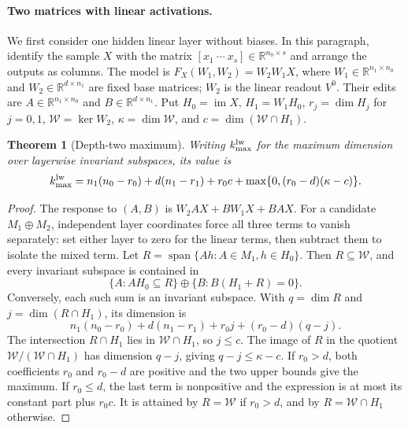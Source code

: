 \documentclass[twoside]{article}
\newtheorem{theorem}{Theorem}
\theoremstyle{remark}
\DeclareMathOperator{\spanop}{span}
\newcommand{\R}{\mathbb R}
\theoremstyle{highlightdefinition}
\theoremstyle{remark}
\newcommand{\spn}{\spanop}
\begin{document}
\paragraph{Two matrices with linear activations.}
We first consider one hidden linear layer without biases. In this paragraph, identify the sample $X$ with the matrix $[x_1\ \cdots\ x_s]\in\R^{n_0\times s}$ and arrange the outputs as columns. The model is $F_X(W_1,W_2)=W_2W_1X$, where $W_1\in\R^{n_1\times n_0}$ and $W_2\in\R^{d\times n_1}$ are fixed base matrices; $W_2$ is the linear readout $V^0$. Their edits are $A\in\R^{n_1\times n_0}$ and $B\in\R^{d\times n_1}$. Put $H_0=\operatorname{im}X$, $H_1=W_1H_0$, $r_j=\dim H_j$ for $j=0,1$, $\mathcal W=\ker W_2$, $\kappa=\dim\mathcal W$, and $c=\dim(\mathcal W\cap H_1)$.
\begin{theorem}[Depth-two maximum]\label{thm:depth-two}
Writing $k_{\max}^{\rm lw}$ for the maximum dimension over layerwise invariant subspaces, its value is
\[
 k_{\max}^{\rm lw}=n_1(n_0-r_0)+d(n_1-r_1)+r_0c
                  +\max\{0,(r_0-d)(\kappa-c)\}.
\]
\end{theorem}
\begin{proof}
The response to $(A,B)$ is $W_2AX+BW_1X+BAX$. For a candidate $M_1\oplus M_2$, independent layer coordinates force all three terms to vanish separately: set either layer to zero for the linear terms, then subtract them to isolate the mixed term. Let $R=\spn\{Ah:A\in M_1,h\in H_0\}$. Then $R\subseteq\mathcal W$, and every invariant subspace is contained in
\[
 \{A:AH_0\subseteq R\}\oplus\{B:B(H_1+R)=0\}.
\]
Conversely, each such sum is an invariant subspace. With $q=\dim R$ and $j=\dim(R\cap H_1)$, its dimension is
\[
 n_1(n_0-r_0)+d(n_1-r_1)+r_0j+(r_0-d)(q-j).
\]
The intersection $R\cap H_1$ lies in $\mathcal W\cap H_1$, so $j\le c$. The image of $R$ in the quotient $\mathcal W/(\mathcal W\cap H_1)$ has dimension $q-j$, giving $q-j\le\kappa-c$. If $r_0>d$, both coefficients $r_0$ and $r_0-d$ are positive and the two upper bounds give the maximum. If $r_0\le d$, the last term is nonpositive and the expression is at most its constant part plus $r_0c$. It is attained by $R=\mathcal W$ if $r_0>d$, and by $R=\mathcal W\cap H_1$ otherwise.
\end{proof}
\end{document}
